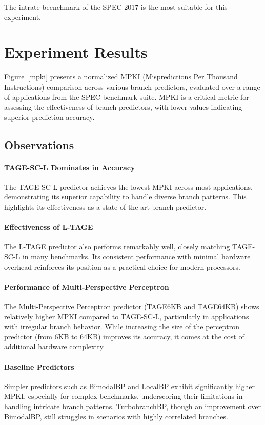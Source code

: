 \documentclass[10pt,journal,compsoc]{IEEEtran}
\begin{document}
The intrate beenchmark of the SPEC 2017 is the most suitable for this experiment. 


\section{Experiment Results}\label{results}
Figure~\ref{mpki} presents a normalized MPKI (Mispredictions Per Thousand Instructions) comparison across various branch predictors, evaluated over a range of applications from the SPEC benchmark suite. MPKI is a critical metric for assessing the effectiveness of branch predictors, with lower values indicating superior prediction accuracy.

\subsection{Observations}

\paragraph*{TAGE-SC-L Dominates in Accuracy}
The TAGE-SC-L predictor achieves the lowest MPKI across most applications, demonstrating its superior capability to handle diverse branch patterns. This highlights its effectiveness as a state-of-the-art branch predictor.

\paragraph*{Effectiveness of L-TAGE}
The L-TAGE predictor also performs remarkably well, closely matching TAGE-SC-L in many benchmarks. Its consistent performance with minimal hardware overhead reinforces its position as a practical choice for modern processors.

\paragraph*{Performance of Multi-Perspective Perceptron}
The Multi-Perspective Perceptron predictor (TAGE6KB and TAGE64KB) shows relatively higher MPKI compared to TAGE-SC-L, particularly in applications with irregular branch behavior. While increasing the size of the perceptron predictor (from 6KB to 64KB) improves its accuracy, it comes at the cost of additional hardware complexity.

\paragraph*{Baseline Predictors}
Simpler predictors such as BimodalBP and LocalBP exhibit significantly higher MPKI, especially for complex benchmarks, underscoring their limitations in handling intricate branch patterns. TurbobranchBP, though an improvement over BimodalBP, still struggles in scenarios with highly correlated branches.
\end{document}
